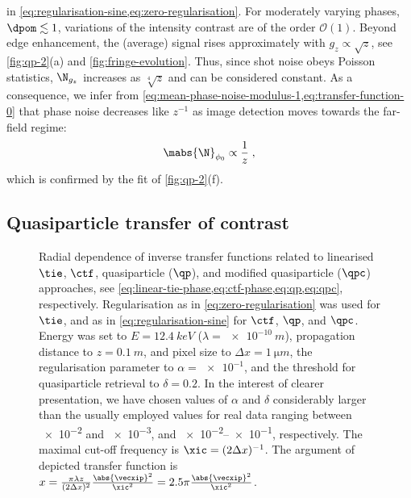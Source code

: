 \documentclass[
twoside,
openright,
titlepage,
numbers=noenddot,
headinclude,
fleqn,
a4paper,
footinclude=true,
cleardoublepage=empty,
abstractoff,
BCOR=5mm,
paper=a4,
fontsize=11pt,
british,ngerman,american,
]{scrreprt}
\begin{document}
in \cref{eq:regularisation-sine,eq:zero-regularisation}.  For
moderately varying phases, $\dpom\lesssim 1$, variations of the
intensity contrast are of the order $\mathcal{O}(1)$.  Beyond edge
enhancement, the (average) signal rises approximately with
$g_z\propto\sqrt{z}$, see \cref{fig:qp-2}(a) and
\cref{fig:fringe-evolution}.  Thus, since shot noise obeys Poisson
statistics, $\N_{g_z}$ increases as $\sqrt[4]{z}$ and can be
considered constant.  As a consequence, we infer from
\cref{eq:mean-phase-noise-modulus-1,eq:transfer-function-0} that phase
noise decreases like $z^{-1}$ as image detection moves towards the
far-field regime:
\begin{equation}
  \label{eq:phase-noise}
      \mabs{\N}_{\phi_0} \propto \frac{1}{z} \;,
\end{equation}
which is confirmed by the fit of \cref{fig:qp-2}(f).


\subsection{Quasiparticle transfer of contrast}
\label{sec:qp-ctf}

\begin{figure} 
  \centering
  \caption[Fourier space filter (regularised inverse transfer
  functions) for linear and quasilinear phase retrieval.]{Radial
    dependence of inverse transfer functions related to linearised
    $\tie$, $\ctf$, quasiparticle ($\qp$), and modified quasiparticle
    ($\qpc$) approaches, see
    \cref{eq:linear-tie-phase,eq:ctf-phase,eq:qp,eq:qpc},
    respectively.  Regularisation as in \cref{eq:zero-regularisation}
    was used for $\tie$, and as in \cref{eq:regularisation-sine} for
    $\ctf$, $\qp$, and $\qpc$.  Energy was set to $E=\SI{12.4}{keV}$
    ($\lambda=\SI{e-10}{m}$), propagation distance to $z=\SI{0.1}{m}$,
    and pixel size to $\Delta x = \SI{1}{\micro m}$, the
    regularisation parameter to $\alpha=\num{e-1}$, and the threshold
    for quasiparticle retrieval to $\delta=\num{0.2}$.  In the
    interest of clearer presentation, we have chosen values of
    $\alpha$ and $\delta$ considerably larger than the usually
    employed values for real data ranging between \num{e-2} and
    \num{e-3}, and \numrange{e-2}{e-1}, respectively.  The maximal
    cut-off frequency is $\xic=(2\Delta x)^{-1}$.  The argument of
    depicted transfer function is $x=\frac{\pi\lambda z}{(2\Delta
      x)^2}\frac{\abs{\vecxip}^2}{\xic^2} =
    2.5\pi\frac{\abs{\vecxip}^2}{\xic^2}$.}
  \label{fig:phase-filter-qp}
\end{figure}
\end{document}
